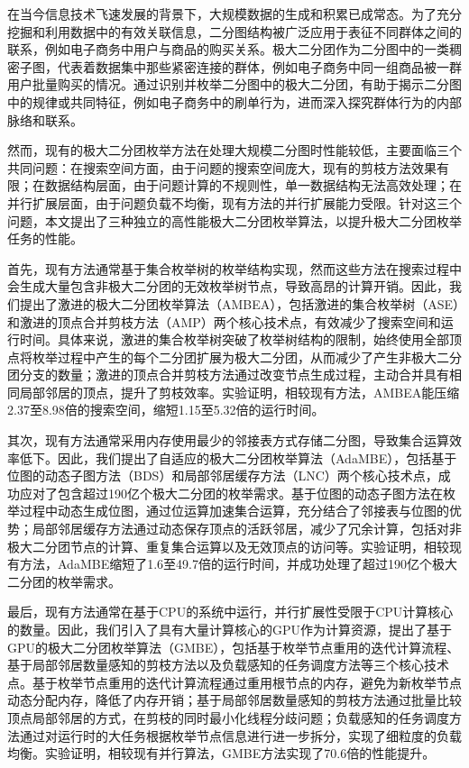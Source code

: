 \cleardoublepage
{}

在当今信息技术飞速发展的背景下，大规模数据的生成和积累已成常态。为了充分挖掘和利用数据中的有效关联信息，二分图结构被广泛应用于表征不同群体之间的联系，例如电子商务中用户与商品的购买关系。极大二分团作为二分图中的一类稠密子图，代表着数据集中那些紧密连接的群体，例如电子商务中同一组商品被一群用户批量购买的情况。通过识别并枚举二分图中的极大二分团，有助于揭示二分图中的规律或共同特征，例如电子商务中的刷单行为，进而深入探究群体行为的内部脉络和联系。

然而，现有的极大二分团枚举方法在处理大规模二分图时性能较低，主要面临三个共同问题：在搜索空间方面，由于问题的搜索空间庞大，现有的剪枝方法效果有限；在数据结构层面，由于问题计算的不规则性，单一数据结构无法高效处理；在并行扩展层面，由于问题负载不均衡，现有方法的并行扩展能力受限。针对这三个问题，本文提出了三种独立的高性能极大二分团枚举算法，以提升极大二分团枚举任务的性能。

首先，现有方法通常基于集合枚举树的枚举结构实现，然而这些方法在搜索过程中会生成大量包含非极大二分团的无效枚举树节点，导致高昂的计算开销。因此，我们提出了激进的极大二分团枚举算法（AMBEA），包括激进的集合枚举树（ASE）和激进的顶点合并剪枝方法（AMP）两个核心技术点，有效减少了搜索空间和运行时间。具体来说，激进的集合枚举树突破了枚举树结构的限制，始终使用全部顶点将枚举过程中产生的每个二分团扩展为极大二分团，从而减少了产生非极大二分团分支的数量；激进的顶点合并剪枝方法通过改变节点生成过程，主动合并具有相同局部邻居的顶点，提升了剪枝效率。实验证明，相较现有方法，AMBEA能压缩2.37至8.98倍的搜索空间，缩短1.15至5.32倍的运行时间。

其次，现有方法通常采用内存使用最少的邻接表方式存储二分图，导致集合运算效率低下。因此，我们提出了自适应的极大二分团枚举算法（AdaMBE），包括基于位图的动态子图方法（BDS）和局部邻居缓存方法（LNC）两个核心技术点，成功应对了包含超过190亿个极大二分团的枚举需求。基于位图的动态子图方法在枚举过程中动态生成位图，通过位运算加速集合运算，充分结合了邻接表与位图的优势；局部邻居缓存方法通过动态保存顶点的活跃邻居，减少了冗余计算，包括对非极大二分团节点的计算、重复集合运算以及无效顶点的访问等。实验证明，相较现有方法，AdaMBE缩短了1.6至49.7倍的运行时间，并成功处理了超过190亿个极大二分团的枚举需求。

最后，现有方法通常在基于CPU的系统中运行，并行扩展性受限于CPU计算核心的数量。因此，我们引入了具有大量计算核心的GPU作为计算资源，提出了基于GPU的极大二分团枚举算法（GMBE），包括基于枚举节点重用的迭代计算流程、基于局部邻居数量感知的剪枝方法以及负载感知的任务调度方法等三个核心技术点。基于枚举节点重用的迭代计算流程通过重用根节点的内存，避免为新枚举节点动态分配内存，降低了内存开销；基于局部邻居数量感知的剪枝方法通过批量比较顶点局部邻居的方式，在剪枝的同时最小化线程分歧问题；负载感知的任务调度方法通过对运行时的大任务根据枚举节点信息进行进一步拆分，实现了细粒度的负载均衡。实验证明，相较现有并行算法，GMBE方法实现了70.6倍的性能提升。

